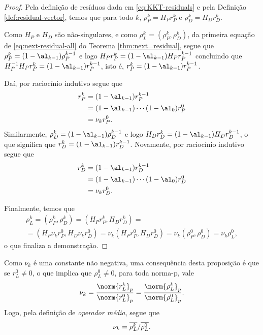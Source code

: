 \begin{proof}
	Pela definição de resíduos  dada em \eqref{eq:KKT-residuals}   e pela Definição \ref{def:residual-vector}, temos que para todo $k$, $\rho_{P}^{k} = H_{P}r_{P}^{k} $ e  $\rho_{D}^{k} = H_{D}r_{D}^{k} $. 

	Como $H_{P}$ e $H_{D}$ são não-singulares, e como $\rho_L^{k} = (\rho_P^{k},\rho_D^{k})$,  da primeira equação de \eqref{eq:next-residual-all} do Teorema \ref{thm:next=residual}, segue que $\rho_P^{k}  = (1-\al_{k-1})\rho_P^{k-1}$ e logo $
			H_{P}r_{P}^{k}  = (1-\al_{k-1})H_{P}r_{P}^{k-1}$ concluindo que  
		$H_{P}^{-1}H_{P}r_{P}^{k}  = (1-\al_{k-1})r_{P}^{k-1}$, isto é, $r_{P}^{k}  = (1-\al_{k-1})r_{P}^{k-1}$.

	Daí, por raciocínio indutivo segue que 
	\[
	\begin{aligned}
		r_{P}^{k} & = (1-\al_{k-1})r_{P}^{k-1} \\
	  			   & = (1-\al_{k-1})\cdots(1-\al_{0})r_{P}^{0}\\
				   & = \nu_k r_{P}^{0}. 
	\end{aligned}
	\]
Similarmente,  $\rho_D^{k}  = (1-\al_{k-1})\rho_D^{k-1}$ e logo $
			H_{D}r_{D}^{k}  = (1-\al_{k-1})H_{D}r_{D}^{k-1}$, o que significa que   $r_{D}^{k}  = (1-\al_{k-1})r_{D}^{k-1}$. Novamente,  por raciocínio indutivo segue que 
	\[
	\begin{aligned}
		r_{D}^{k} & = (1-\al_{k-1})r_{D}^{k-1} \\
	  			   & = (1-\al_{k-1})\cdots(1-\al_{0})r_{D}^{0}\\
				   & = \nu_k r_{D}^{0}. 
	\end{aligned}
	\]

	Finalmente, temos que 
	\begin{multline*}
	\rho_L^{k} = (\rho_P^{k},\rho_D^{k}) = (H_{P}r_P^{k},H_{D}r_D^{k}) =\\ = (H_{P}\nu_k r_{P}^{0},H_{D}\nu_k r_{D}^{0})  
	= \nu_k (H_{P}r_{P}^{0},H_{D} r_{D}^{0}) =\nu_k(\rho_P^{0},\rho_D^{0}) = \nu_k \rho_L^{0},
		\end{multline*}	
		o 	que finaliza a demonstração.
\end{proof}

Como  $\nu_k$ é uma constante não negativa,  uma consequência desta proposição é que se $r_L^0\neq 0 $, o que implica que $\rho_L^0\neq 0 $, para toda norma-p, vale 
\[
\nu_k =\frac{\norm{r_L^{k}}_p}{\norm{r_L^{0}}_p} = \frac{\norm{\rho_L^{k}}_p}{\norm{\rho_L^{0}}_p}.
\]
Logo, pela definição de \emph{operador média}, segue que
\begin{equation}
	\label{eq:nu_k}
	\nu_k = {\overline{\rho_L^k}}/{\overline{\rho_L^0}}.
\end{equation}

